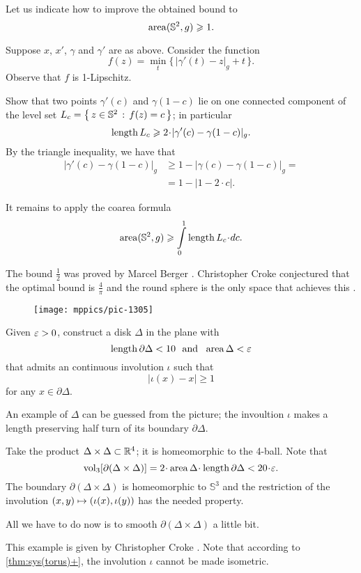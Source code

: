 Let us indicate how to improve the obtained bound to
\[\operatorname{\rm area}\nolimits(\mathbb{S}^2,g)\geqslant1.\]

Suppose $x$, $x'$, $\gamma$ and $\gamma'$ are as above.
Consider the function
\[f(z)=\min_t \{\,|\gamma'(t)-z|_g+t\,\}.\]
Observe that $f$ is 1-Lipschitz.

Show that two points $\gamma'(c)$ and $\gamma(1-c)$ lie on one connected component of the level set $L_c=\left\{\,{z\in\mathbb{S}^2}\,:\,{f(z)=c}\,\right\}$;
in particular 
\[\length L_c\ge 2\cdot|\gamma'(c)-\gamma(1-c)|_g.\]
By the triangle inequality, we have that
\begin{align*}
|\gamma'(c)-\gamma(1-c)|_g&\ge 1-|\gamma(c)-\gamma(1-c)|_g=
\\
&=1-|1-2\cdot c|.
\end{align*}

It remains to apply the coarea formula
\[\area(\mathbb{S}^2,g)\ge \int\limits_0^1\length L_c\cdot dc.\]

The bound $\tfrac12$ was proved by Marcel Berger \cite{berger}. 
Christopher Croke conjectured that the optimal bound is $\tfrac4\pi$ and the round sphere is the only space that achieves this \cite[Conjecture 0.3 in][]{croke}.

\begin{wrapfigure}{r}{20 mm}
\vskip-0mm
\centering
\texttt{[image: mppics/pic-1305]}
\end{wrapfigure}

Given $\varepsilon>0$, construct a disk $\Delta$ in the plane with 
\[\mathop{\rm length}\nolimits\partial \Delta<10\ \ \text{and}\ \ \operatorname{\rm area}\nolimits \Delta<\varepsilon\]
that admits an continuous involution $\iota$ such that 
\[|\iota(x)-x|\ge 1\]
for any $x\in\partial \Delta$.

An example of $\Delta$ can be guessed from the picture;
the invoultion $\iota$ makes a length preserving half turn of its boundary $\partial \Delta$.


Take the product $\Delta\times \Delta\subset \mathbb{R}^4$;
it is homeomorphic to the 4-ball.
Note that 
$$\vol_3[\partial(\Delta\times \Delta)]=2\cdot\area \Delta\cdot\length \partial \Delta<20\cdot\eps.$$
The boundary $\partial(\Delta\times \Delta)$ is homeomorphic to $\mathbb{S}^3$
and the restriction of the involution $(x,y)\z\mapsto (\iota(x),\iota(y))$ has the needed property.

All we have to do now is to smooth $\partial(\Delta\times \Delta)$ a little bit.

 This example is given by Christopher Croke \cite{croke}.
Note that according to \ref{thm:sys(torus)+}, 
the involution $\iota$ cannot be made isometric.

